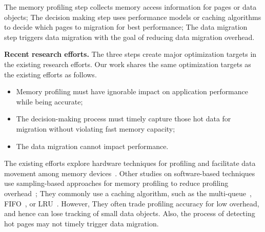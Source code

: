 The memory profiling step collects memory access information for pages or data objects; The decision making step uses performance models or caching algorithms to decide which pages to migration for best performance; The data migration step triggers data migration with the goal of reducing data migration overhead.

\textbf{Recent research efforts.}
The three steps create major optimization targets in the existing research efforts. %
Our work shares the same optimization targets as the existing efforts as follows.
\begin{itemize}[leftmargin=*]
    \item Memory profiling must have ignorable impact on application performance while being accurate;
    \item The decision-making process must timely capture those hot data for migration without violating fast memory capacity;
    \item The data migration cannot impact performance. %
\end{itemize}

The existing efforts explore hardware techniques for profiling and facilitate data movement among memory devices~\cite{asplos15:agarwal,hetero_mem_arch,qureshi_micro09, ibm_isca09, Ramos:ics11,gpu_pcm_pact13,hpdc16:wu,row_buffer_pcm_iccd12}. Other studies on software-based techniques use sampling-based approaches for memory profiling to reduce profiling overhead~\cite{Thermostat:asplos17,RAMinate:socc16,heteros:isca17, unimem:sc17, sc18:wu}; They commonly use a caching algorithm, such as the multi-queue~\cite{RAMinate:socc16,Ramos:ics11, 5260554}, FIFO~\cite{Yan:ASPLOS19}, or LRU~\cite{heteros:isca17}. However, They often trade profiling accuracy for low overhead, and hence can lose tracking of small data objects. Also, the process of detecting hot pages may not timely trigger data migration. 

